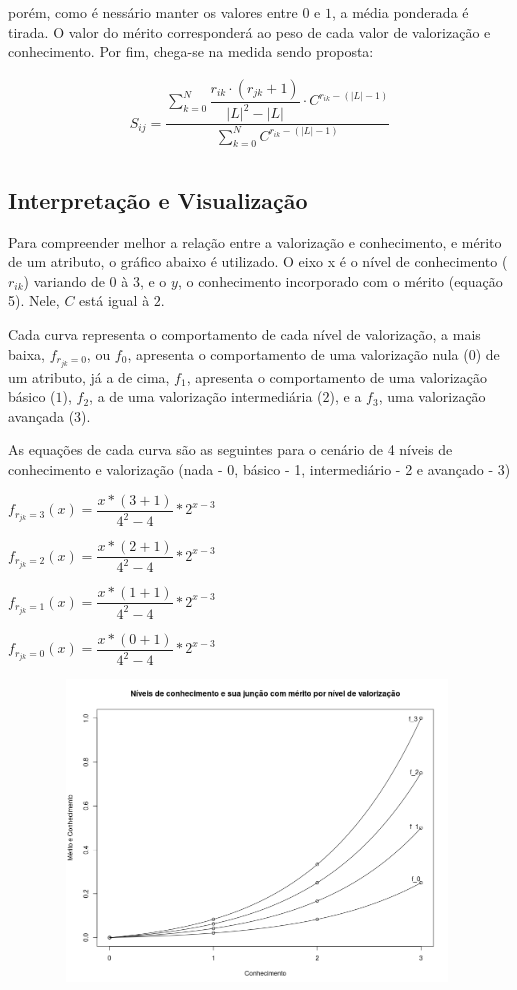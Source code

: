 \documentclass[]{article}
\begin{document}
	
	porém, como é nessário manter os valores entre $0$ e $1$, a média ponderada é tirada. O valor do mérito corresponderá ao peso de cada valor de valorização e conhecimento. Por fim, chega-se na medida sendo proposta:
	
	\begin{center}
		\begin{equation}
			  \begin{multlined}
				S_{ij} = \dfrac{\sum_{k = 0}^N \dfrac{r_{ik}\cdot(r_{jk} + 1)}{|L|^2 - |L|} \cdot C^{r_{ik} - (|L| - 1)}}{\sum_{k = 0}^N C^{r_{ik} - (|L| - 1)}} \\
			  \end{multlined}
		\end{equation}	
	\end{center}
	
	\subsection{Interpretação e Visualização}
	
	Para compreender melhor a relação entre a valorização e conhecimento, e mérito de um atributo, o gráfico abaixo é utilizado. O eixo x é o nível de conhecimento ($r_{ik}$) variando de $0$ à $3$, e o $y$, o conhecimento incorporado com o mérito (equação 5). Nele, $C$ está igual à $2$.
	
	Cada curva representa o comportamento de cada nível de valorização, a mais baixa, $f_{r_{jk} = 0}$, ou $f_0$, apresenta o comportamento de uma valorização nula ($0$) de um atributo, já a de cima, $f_1$, apresenta o comportamento de uma valorização básico ($1$), $f_2$, a de uma valorização intermediária ($2$), e a $f_3$, uma valorização avançada ($3$).
	
	As equações de cada curva são as seguintes para o cenário de 4 níveis de conhecimento e valorização (nada - 0, básico - 1, intermediário - 2 e avançado - 3)
	
	\begin{center}
		$ f_{r_{jk} = 3}(x) = \dfrac{x*(3 + 1)}{4^2 - 4} * 2^{x - 3} $
		
		$ f_{r_{jk} = 2}(x) = \dfrac{x*(2 + 1)}{4^2 - 4} * 2^{x - 3} $
		
		$ f_{r_{jk} = 1}(x) = \dfrac{x*(1 + 1)}{4^2 - 4} * 2^{x - 3} $
		
		$ f_{r_{jk} = 0}(x) = \dfrac{x*(0 + 1)}{4^2 - 4} * 2^{x - 3} $
	\end{center}
	\includegraphics[width=13.2cm, height=8cm]{plot}
	
\end{document}
